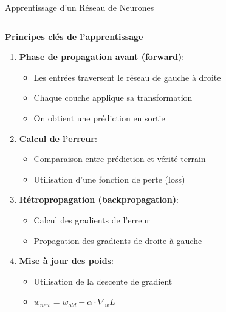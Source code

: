 \documentclass[aspectratio=169,11pt]{beamer}
\begin{document}
\begin{frame}{Apprentissage d'un Réseau de Neurones}
    \begin{columns}
        \begin{column}{0.6\textwidth}
            \textbf{Principes clés de l'apprentissage}
            \begin{enumerate}
                \item \textbf{Phase de propagation avant (forward)}:
                \begin{itemize}
                    \item Les entrées traversent le réseau de gauche à droite
                    \item Chaque couche applique sa transformation
                    \item On obtient une prédiction en sortie
                \end{itemize}
                \item \textbf{Calcul de l'erreur}:
                \begin{itemize}
                    \item Comparaison entre prédiction et vérité terrain
                    \item Utilisation d'une fonction de perte (loss)
                \end{itemize}
                \item \textbf{Rétropropagation (backpropagation)}:
                \begin{itemize}
                    \item Calcul des gradients de l'erreur
                    \item Propagation des gradients de droite à gauche
                \end{itemize}
                \item \textbf{Mise à jour des poids}:
                \begin{itemize}
                    \item Utilisation de la descente de gradient
                    \item $w_{new} = w_{old} - \alpha \cdot \nabla_w L$
                \end{itemize}
            \end{enumerate}
        \end{column}
        \begin{column}{0.4\textwidth}

\end{column}
\end{columns}
\end{frame}
\end{document}
